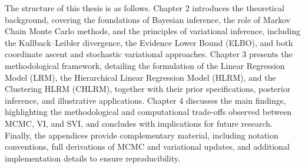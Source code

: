 \medskip

The structure of this thesis is as follows. Chapter 2 introduces the theoretical background, covering the foundations of Bayesian inference, the role of Markov Chain Monte Carlo methods, and the principles of variational inference, including the Kullback--Leibler divergence, the Evidence Lower Bound (ELBO), and both coordinate ascent and stochastic variational approaches. Chapter 3 presents the methodological framework, detailing the formulation of the Linear Regression Model (LRM), the Hierarchical Linear Regression Model (HLRM), and the Clustering HLRM (CHLRM), together with their prior specifications, posterior inference, and illustrative applications. Chapter 4 discusses the main findings, highlighting the methodological and computational trade-offs observed between MCMC, VI, and SVI, and concludes with implications for future research. Finally, the appendices provide complementary material, including notation conventions, full derivations of MCMC and variational updates, and additional implementation details to ensure reproducibility.
